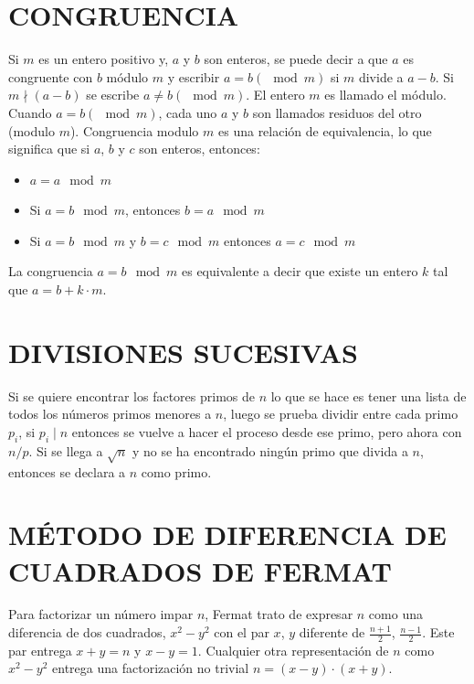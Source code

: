 \documentclass[12pt,letterpaper]{book}
\begin{document}
    \section{CONGRUENCIA}
    Si $m$ es un entero positivo y, $a$ y $b$ son enteros, se puede decir a que $a$ es congruente con $b$ módulo $m$ y escribir $a = b(\mod m)$ si $m$ divide a $a-b$. Si $m \nmid (a-b)$ se escribe $a \not = b(\mod m)$. El entero $m$ es llamado el módulo. Cuando $a = b (\mod m)$, cada uno $a$ y $b$ son llamados residuos del otro (modulo $m$). Congruencia modulo $m$ es una relación de equivalencia, lo que significa que si $a$, $b$ y $c$ son enteros, entonces:
    
    \begin{itemize}
        \item{$a = a \mod m$}
        \item{Si $a = b \mod m$, entonces $b = a \mod m$}
        \item{Si $a = b \mod m$ y $b = c \mod m$ entonces $a = c \mod m$}
    \end{itemize}
    La congruencia $a = b \mod m$ es equivalente a decir que existe un entero $k$ tal que $a = b + k\cdot m$.

    \section{DIVISIONES SUCESIVAS}
    Si se quiere encontrar los factores primos de $n$ lo que se hace es tener una lista de todos los números primos menores a $n$, luego se prueba dividir  entre cada primo $p_{i}$, si $p_{i} \mid n$ entonces se vuelve a hacer el proceso desde ese primo, pero ahora con $n/p$. Si se llega a $\sqrt{n}$ y no se ha encontrado ningún primo que divida a $n$, entonces se declara a $n$ como primo.

    \section{MÉTODO DE DIFERENCIA DE CUADRADOS DE FERMAT}
    Para factorizar un número impar $n$, Fermat trato de expresar $n$ como una diferencia de dos cuadrados, $x^{2}-y^{2}$ con el par $x$, $y$ diferente de $\frac{n+1}{2}$, $\frac{n-1}{2}$. Este par entrega $x + y = n$ y $x - y =1$. Cualquier otra representación de $n$ como $x^{2}-y^{2}$ entrega una factorización no trivial $n = (x - y)\cdot (x + y)$.
\end{document}
